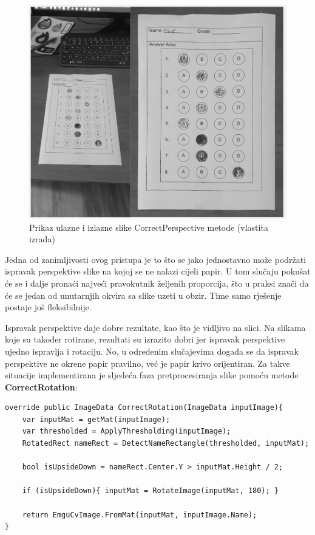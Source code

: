 \documentclass{foi}
\begin{document}
\begin{figure}[H]
\centering
\includegraphics[width=0.8\linewidth]{slike/PerspectiveComparison.png}
\caption{Prikaz ulazne i izlazne slike CorrectPerspective metode (vlastita izrada)}
\end{figure}

Jedna od zanimljivosti ovog pristupa je to što se jako jednostavno može podržati ispravak perspektive slike na kojoj se ne nalazi cijeli papir. U tom slučaju pokušat će se i dalje pronaći najveći pravokutnik željenih proporcija, što u praksi znači da će se jedan od unutarnjih okvira sa slike uzeti u obzir. Time samo rješenje postaje još fleksibilnije.

Ispravak perspektive daje dobre rezultate, kao što je vidljivo na slici. Na slikama koje su također rotirane, rezultati su izrazito dobri jer ispravak perspektive ujedno ispravlja i rotaciju. No, u određenim slučajevima događa se da ispravak perspektive ne okrene papir pravilno, već je papir krivo orijentiran. Za takve situacije implementirana je sljedeća faza pretprocesiranja slike pomoću metode \textbf{CorrectRotation}:


\begin{lstlisting}[caption={Metoda za provjeru i ispravak orijentacije slike}]
override public ImageData CorrectRotation(ImageData inputImage){
    var inputMat = getMat(inputImage);
    var thresholded = ApplyThresholding(inputImage);
    RotatedRect nameRect = DetectNameRectangle(thresholded, inputMat);

    bool isUpsideDown = nameRect.Center.Y > inputMat.Height / 2;

    if (isUpsideDown){ inputMat = RotateImage(inputMat, 180); }

    return EmguCvImage.FromMat(inputMat, inputImage.Name);
}
\end{lstlisting}
\end{document}
